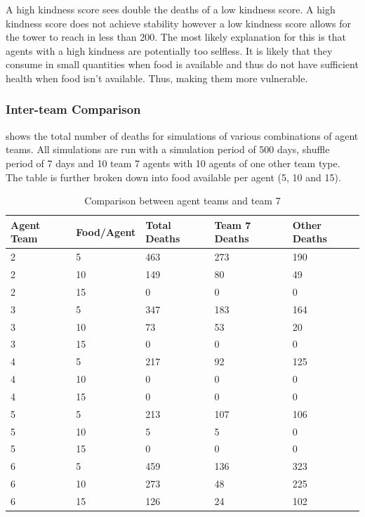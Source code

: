 A high kindness score sees double the deaths of a low kindness score. A high kindness score does not achieve stability however a low kindness score allows for the tower to reach in less than 200. The most likely explanation for this is that agents with a high kindness are potentially too selfless. It is likely that they consume in small quantities when food is available and thus do not have sufficient health when food isn't available. Thus, making them more vulnerable.

\subsubsection{Inter-team Comparison}
 shows the total number of deaths for simulations of various combinations of agent teams. All simulations are run with a simulation period of 500 days, shuffle period of 7 days and 10 team 7 agents with 10 agents of one other team type. The table is further broken down into food available per agent (5, 10 and 15).

\begin{table}
    \begin{center}
    \begin{tabular} { | m{4em} | m{6em} | m{4em} | m{4em} | m{4em} | }
        \hline
        \textbf{Agent Team} & \textbf{Food/Agent} & \textbf{Total Deaths} & \textbf{Team 7 Deaths} & \textbf{Other Deaths} \\
        \hline
        2 & 5 & 463 & 273 & 190 \\
        \hline
        2 & 10 & 149 & 80 & 49 \\
        \hline
        2 & 15 & 0 & 0 & 0 \\
        \hline
        3 & 5 & 347 & 183 & 164\\
        \hline
        3 & 10 & 73 & 53 & 20\\
        \hline
        3 & 15 & 0 & 0 & 0 \\
        \hline
        4 & 5 & 217 & 92 & 125\\
        \hline
        4 & 10 & 0 & 0 & 0 \\
        \hline
        4 & 15 & 0 & 0 & 0 \\
        \hline
        5 & 5 & 213 & 107 & 106 \\
        \hline
        5 & 10 & 5 & 5 & 0 \\
        \hline
        5 & 15 &  0 & 0 & 0 \\ 
        \hline
        6 & 5 & 459 & 136 & 323 \\
        \hline
        6 & 10 & 273 & 48 & 225 \\
        \hline
        6 & 15 & 126 & 24 & 102 \\
        \hline
    \end{tabular}
    \end{center}
    \caption{Comparison between agent teams and team 7}
    \label{tab: Inter-team data}
\end{table}


